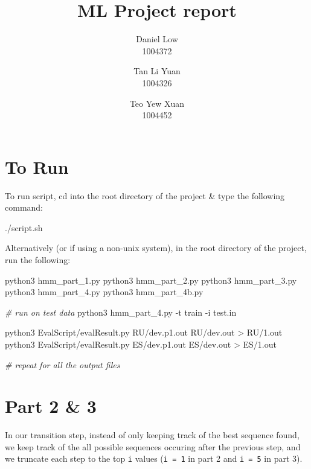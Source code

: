 \documentclass[
]{article}
\title{ML Project report}
\author{Daniel Low \\ 1004372 \and Tan Li Yuan \\1004326 \and Teo Yew Xuan\\1004452}
\date{}
\newenvironment{Shaded}{}{}
\newcommand{\AttributeTok}[1]{\textcolor[rgb]{0.49,0.56,0.16}{#1}}
\newcommand{\CommentTok}[1]{\textcolor[rgb]{0.38,0.63,0.69}{\textit{#1}}}
\newcommand{\ExtensionTok}[1]{#1}
\newcommand{\NormalTok}[1]{#1}
\newcommand{\OperatorTok}[1]{\textcolor[rgb]{0.40,0.40,0.40}{#1}}
\begin{document}
\maketitle

\section{To Run}

To run script, cd into the root directory of the project \& type the
following command:

\begin{Shaded}
\begin{Highlighting}[]
\ExtensionTok{./script.sh}
\end{Highlighting}
\end{Shaded}

Alternatively (or if using a non-unix system), in the root directory of
the project, run the following:

\begin{Shaded}
\begin{Highlighting}[]
\ExtensionTok{python3}\NormalTok{ hmm\_part\_1.py}
\ExtensionTok{python3}\NormalTok{ hmm\_part\_2.py}
\ExtensionTok{python3}\NormalTok{ hmm\_part\_3.py}
\ExtensionTok{python3}\NormalTok{ hmm\_part\_4.py}
\ExtensionTok{python3}\NormalTok{ hmm\_part\_4b.py}

\CommentTok{\# run on test data}
\ExtensionTok{python3}\NormalTok{ hmm\_part\_4.py }\AttributeTok{{-}t}\NormalTok{ train }\AttributeTok{{-}i}\NormalTok{ test.in}

\ExtensionTok{python3}\NormalTok{ EvalScript/evalResult.py RU/dev.p1.out RU/dev.out }\OperatorTok{\textgreater{}}\NormalTok{ RU/1.out}
\ExtensionTok{python3}\NormalTok{ EvalScript/evalResult.py ES/dev.p1.out ES/dev.out }\OperatorTok{\textgreater{}}\NormalTok{ ES/1.out}

\CommentTok{\# repeat for all the output files}
\end{Highlighting}
\end{Shaded}

\hypertarget{part-2-3}{%
\section{Part 2 \& 3}\label{part-2-3}}

In our transition step, instead of only keeping track of the best
sequence found, we keep track of the all possible sequences occuring
after the previous step, and we truncate each step to the top \texttt{i}
values (\texttt{i\ =\ 1} in part 2 and \texttt{i\ =\ 5} in part 3).
\end{document}
